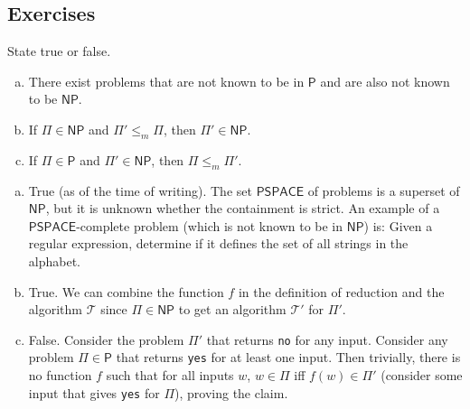 \subsection{Exercises}
	
	\begin{exercise}
		State true or false.
		\begin{enumerate}[(a)]
			\item There exist problems that are not known to be in $\mathsf{P}$ and are also not known to be $\mathsf{NP}$.
			\item If $\mathsf{\Pi}\in\mathsf{NP}$ and $\mathsf{\Pi}' \leq_m \mathsf{\Pi}$, then $\mathsf{\Pi}'\in\mathsf{NP}$.
			\item If $\mathsf{\Pi}\in\mathsf{P}$ and $\mathsf{\Pi}'\in\mathsf{NP}$, then $\mathsf{\Pi}\leq_m\mathsf{\Pi}'$.
		\end{enumerate}
	\end{exercise}
	\begin{solution*}
		\begin{enumerate}[(a)]
			\item True (as of the time of writing). The set \href{https://en.wikipedia.org/wiki/PSPACE}{$\mathsf{PSPACE}$} of problems is a superset of $\mathsf{NP}$, but it is unknown whether the containment is strict. An example of a $\mathsf{PSPACE}$-complete problem (which is not known to be in $\mathsf{NP}$) is: Given a regular expression, determine if it defines the set of all strings in the alphabet.

			\item True. We can combine the function $f$ in the definition of reduction and the algorithm $\mathcal{T}$ since $\mathsf{\Pi} \in \mathsf{NP}$ to get an algorithm $\mathcal{T}'$ for $\mathsf{\Pi}'$.

			\item False. Consider the problem $\mathsf{\Pi}'$ that returns \texttt{no} for any input. Consider any problem $\mathsf{\Pi}\in\mathsf{P}$ that returns \texttt{yes} for at least one input. Then trivially, there is no function $f$ such that for all inputs $w$, $w\in\mathsf{\Pi}$ iff $f(w)\in\mathsf{\Pi}'$ (consider some input that gives \texttt{yes} for $\mathsf{\Pi}$), proving the claim.
		\end{enumerate}
	\end{solution*}